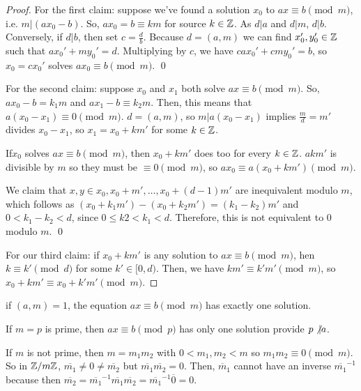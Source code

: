 \documentclass{article}
\begin{document}
\begin{proof}
	For the first claim: suppose we've found a solution $x_0$ to $ax \equiv b \pmod m$, i.e. $m | (ax_0 - b)$. So, $ax_0 = b \equiv km$ for source $k \in \mathbb Z$. As $d | a$ and $d | m$, $d| b$. Conversely, if $d | b$, then set $c = \frac{d}{b}$. Because $d = (a, m)$ we can find $x_0', y_0' \in \mathbb Z$ such that $ax_0' + my_0' = d$. Multiplying by $c$, we have $cax_0' + cmy_0' = b$, so $x_0 = cx_0'$ solves $ax_0 \equiv b \pmod m$. \qed 

	For the second claim: suppose $x_0$ and $x_1$ both solve $ax \equiv b \pmod m$. So, $ax_0 - b = k_1 m$ and $ax_1 - b \equiv k_2 m$. Then, this means that $a(x_0 - x_1) \equiv 0 \pmod m$. $d = (a, m)$, so $m | a(x_0 - x_1)$ implies $\frac{m}{d} = m'$ divides $x_0 - x_1$, so $x_1 = x_0 + km'$ for some $k \in \mathbb Z$. 

	If$x_0$ solves $ax \equiv b \pmod m$, then $x_0 + km'$ does too for every $k \in \mathbb Z$. $akm'$ is divisible by $m$ so they must be $\equiv 0 \pmod m$, so $ax_0 \equiv a(x_0 + km') \pmod m$. 

	We claim that $x, y \in x_0 , x_0 + m', \ldots, x_0 + (d-1)m'$ are inequivalent modulo $m$, which follows as $(x_0 + k_1m') - (x_0 + k_2m') = (k_1 - k_2) m'$ and $0 < k_1 - k_2 < d$, since $0 \leq k2 < k_1 < d$. Therefore, this is not equivalent to $0$ modulo $m$. \qed

	For our third claim: if $x_0 + km'$ is any solution to $ax \equiv b \pmod m$, hen $k \equiv k' \pmod d$ for some $k' \in [0, d)$. Then, we have $km' \equiv k'm' \pmod m$, so $x_0 + km' \equiv x_0 + k'm' \pmod m$.
\end{proof}

\begin{corollary}
	if $(a, m) = 1$, the equation $ax \equiv b \pmod m$ has exactly one solution.
\end{corollary}

\begin{corollary}
	If $m = p$ is prime, then $ax \equiv b \pmod p$ has only one solution provide $p \not\vert a$. 
\end{corollary}

\begin{remark}
	If $m$ is not prime, then $m = m_1 m_2$ with $0 < m_1, m_2 < m$ so $m_1 m_2 \equiv 0 \pmod m$. So in $\mathbb Z / m\mathbb Z$, $\overline{m_1} \neq 0 \neq \overline{m_2}$ but $\overline{m_1} \overline{m_2} = 0$. 
	Then, $\overline m_1$ cannot have an inverse $\overline{m_1}^{-1}$ because then $\overline{m_2} = \overline{m_1}^{-1} \overline{m_1} \overline{m_2} = \overline{m_1}^{-1} \overline{0} = 0$.
\end{remark}
\end{document}
